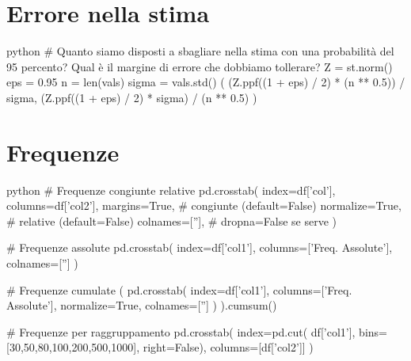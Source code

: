 \documentclass[11pt]{report}
\begin{document}
\section{Errore nella stima}
\begin{mintedbox}{python}
# Quanto siamo disposti a sbagliare nella stima con una probabilità del 95 percento? Qual è il margine di errore che dobbiamo tollerare?
Z = st.norm()
eps = 0.95
n = len(vals)
sigma = vals.std()
(
    (Z.ppf((1 + eps) / 2) * (n ** 0.5)) / sigma,
    (Z.ppf((1 + eps) / 2) * sigma) / (n ** 0.5)
)
\end{mintedbox}

\section{Frequenze}
\begin{mintedbox}{python}
# Frequenze congiunte relative
pd.crosstab(
    index=df['col'],
    columns=df['col2'],
    margins=True,           # congiunte (default=False)
    normalize=True,         # relative (default=False)
    colnames=[''],
    # dropna=False          se serve
)

# Frequenze assolute
pd.crosstab(
    index=df['col1'],
    columns=['Freq. Assolute'],
    colnames=['']
)

# Frequenze cumulate
(
    pd.crosstab(
        index=df['col1'],
        columns=['Freq. Assolute'],
        normalize=True,
        colnames=['']
    )
).cumsum()

# Frequenze per raggruppamento
pd.crosstab(
    index=pd.cut(
        df['col1'],
        bins=[30,50,80,100,200,500,1000],
        right=False),
    columns=[df['col2']]
)
\end{mintedbox}
\end{document}
